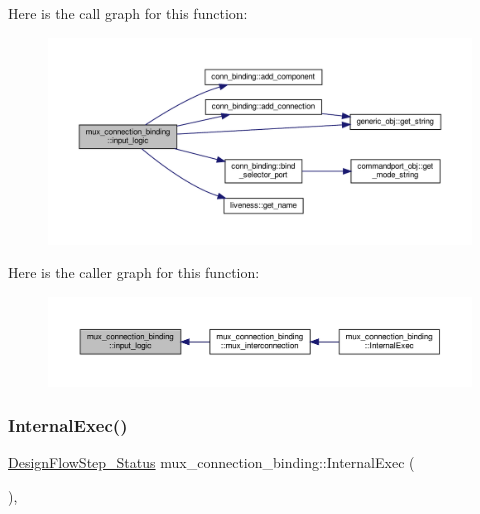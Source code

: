 Here is the call graph for this function\+:
\nopagebreak
\begin{figure}[H]
\begin{center}
\leavevmode
\includegraphics[width=350pt]{d7/d1e/classmux__connection__binding_a0adc59417dbca6bec2932be7341490a0_cgraph}
\end{center}
\end{figure}
Here is the caller graph for this function\+:
\nopagebreak
\begin{figure}[H]
\begin{center}
\leavevmode
\includegraphics[width=350pt]{d7/d1e/classmux__connection__binding_a0adc59417dbca6bec2932be7341490a0_icgraph}
\end{center}
\end{figure}
\mbox{\label{classmux__connection__binding_a87b0d8d8254080cb835394a5eb56eedf}} 
\subsubsection{\texorpdfstring{Internal\+Exec()}{InternalExec()}}
{\footnotesize\ttfamily \hyperlink{design__flow__step_8hpp_afb1f0d73069c26076b8d31dbc8ebecdf}{Design\+Flow\+Step\+\_\+\+Status} mux\+\_\+connection\+\_\+binding\+::\+Internal\+Exec (\begin{DoxyParamCaption}{ }\end{DoxyParamCaption})\hspace{0.3cm}{\ttfamily [override]}, {\ttfamily [virtual]}}



